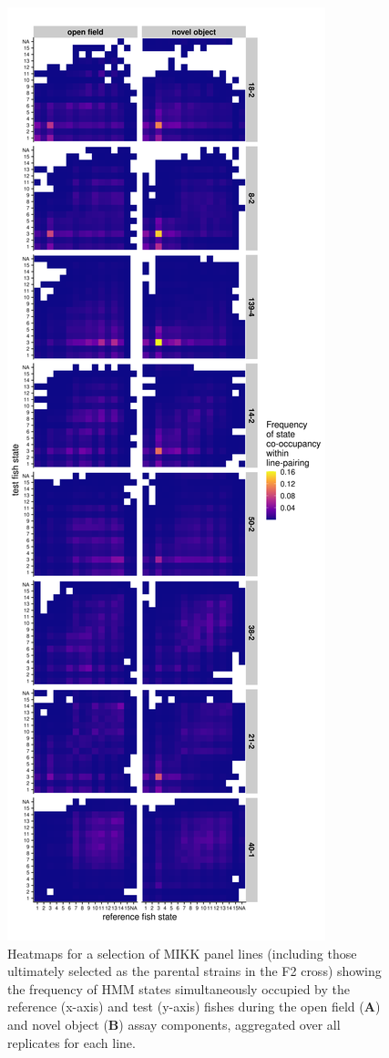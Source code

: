 \documentclass[
]{book}
\begin{document}
\begin{figure}
\includegraphics[width=1\linewidth]{figs/mikk_behaviour/0.08_15_cooc_heatmap} \caption{Heatmaps for a selection of MIKK panel lines (including those ultimately selected as the parental strains in the F2 cross) showing the frequency of HMM states simultaneously occupied by the reference (x-axis) and test (y-axis) fishes during the open field (\textbf{A}) and novel object (\textbf{B}) assay components, aggregated over all replicates for each line.}\label{fig:F0-sge-cooc-heat}
\end{figure}
\end{document}
